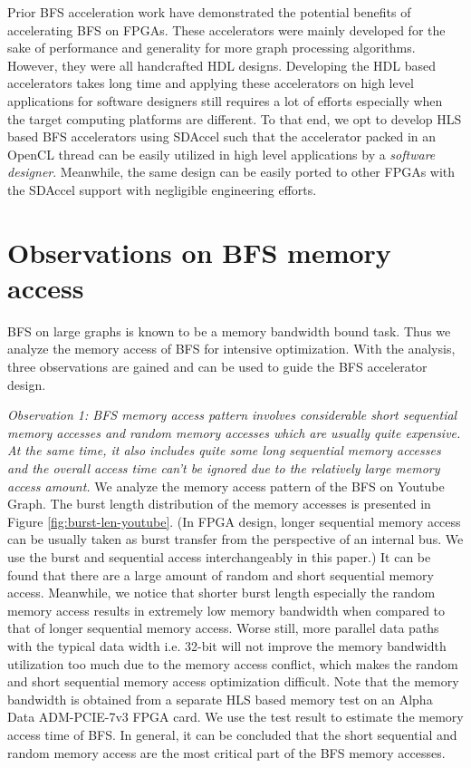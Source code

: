 Prior BFS acceleration work have demonstrated the potential benefits of accelerating 
BFS on FPGAs. These accelerators were mainly developed for the sake 
of performance and generality for more graph processing algorithms. 
However, they were all handcrafted HDL designs. Developing the HDL based accelerators 
takes long time and applying these accelerators 
on high level applications for software designers still requires a lot of 
efforts especially when the target computing platforms are different. 
To that end, we opt to develop HLS based BFS accelerators 
using SDAccel such that the accelerator packed in an 
OpenCL thread can be easily utilized in high level applications 
by a \textit{software designer}. Meanwhile, the same design can be easily 
ported to other FPGAs with the SDAccel support with negligible 
engineering efforts.

\section{Observations on BFS memory access} \label{sec:observation}
BFS on large graphs is known to be a memory bandwidth bound task.
Thus we analyze the memory access of BFS for intensive optimization. 
With the analysis, three observations are gained and can be used to 
guide the BFS accelerator design.

\textit{Observation 1: BFS memory access pattern  
involves considerable short sequential memory accesses 
and random memory accesses which are usually quite 
expensive. At the same time, it also includes quite some long 
sequential memory accesses and the overall access time can't be 
ignored due to the relatively large memory access amount.} We analyze the 
memory access pattern of the BFS on Youtube Graph. The burst length distribution 
of the memory accesses is presented in Figure \ref{fig:burst-len-youtube}. 
(In FPGA design, longer sequential memory access can be usually taken as burst 
transfer from the perspective of an internal bus. We use 
the burst and sequential access interchangeably in this paper.)
It can be found that there are a large amount of random and short sequential 
memory access. Meanwhile, we notice that shorter burst length especially 
the random memory access results in extremely low memory bandwidth 
when compared to that of longer sequential memory access. Worse still, 
more parallel data paths with the typical data width i.e. 32-bit will 
not improve the memory bandwidth utilization too much due to the memory 
access conflict, which makes the random and short sequential 
memory access optimization difficult. Note that the memory bandwidth is obtained 
from a separate HLS based memory test on an Alpha Data ADM-PCIE-7v3 FPGA card.
We use the test result to estimate the memory access time of BFS. 
In general, it can be concluded that the short sequential and random 
memory access are the most critical part of the BFS memory accesses. 
 
